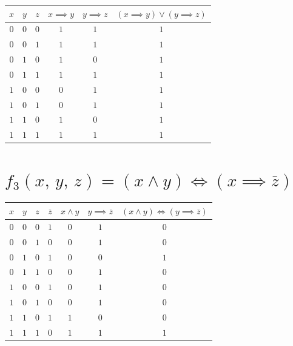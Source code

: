 \documentclass[12pt,a4paper]{article}
\theoremstyle{plain}
\theoremstyle{definition}
\theoremstyle{remark}
\numberwithin{equation}{section}
\begin{document}
\begin{tabularx}{0.6\textwidth}{|c|c|c|c|c|C|}
  \hline
  $x$ & $y$ & $z$ & $x \implies y$ & $y \implies z$ & $(x \implies y) \lor (y \implies z)$ \\
  \hline
  $0$ & $0$ & $0$ & $1$ & $1$ & $1$ \\
  $0$ & $0$ & $1$ & $1$ & $1$ & $1$ \\  
  $0$ & $1$ & $0$ & $1$ & $0$ & $1$ \\
  $0$ & $1$ & $1$ & $1$ & $1$ & $1$ \\
  $1$ & $0$ & $0$ & $0$ & $1$ & $1$ \\
  $1$ & $0$ & $1$ & $0$ & $1$ & $1$ \\
  $1$ & $1$ & $0$ & $1$ & $0$ & $1$ \\
  $1$ & $1$ & $1$ & $1$ & $1$ & $1$ \\
  \hline  
\end{tabularx}

\section{$f_3(x,\,y,\,z) = (x \land y) \iff (x \implies \overline{z})$}

\begin{tabularx}{0.6\textwidth}{|c|c|c|c|c|c|C|}
  \hline
  $x$ & $y$ & $z$ & $\overline{z}$ & $x \land y$ & $y \implies \overline{z}$ & $(x \land y) \iff (y \implies \overline{z})$ \\
  \hline
  $0$ & $0$ & $0$ & $1$ & $0$ & $1$ & $0$ \\
  $0$ & $0$ & $1$ & $0$ & $0$ & $1$ & $0$ \\  
  $0$ & $1$ & $0$ & $1$ & $0$ & $0$ & $1$ \\
  $0$ & $1$ & $1$ & $0$ & $0$ & $1$ & $0$ \\
  $1$ & $0$ & $0$ & $1$ & $0$ & $1$ & $0$ \\
  $1$ & $0$ & $1$ & $0$ & $0$ & $1$ & $0$ \\
  $1$ & $1$ & $0$ & $1$ & $1$ & $0$ & $0$ \\
  $1$ & $1$ & $1$ & $0$ & $1$ & $1$ & $1$ \\
  \hline  
\end{tabularx}
\end{document}
